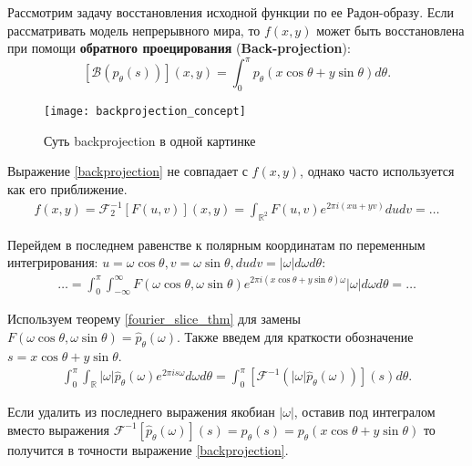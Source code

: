 
Рассмотрим задачу восстановления исходной функции по ее Радон-образу. Если рассматривать модель непрерывного мира, то $f(x, y)$ может быть восстановлена при помощи \textbf{обратного проецирования} (\textbf{Back-projection}):
\begin{equation}
\label{backprojection}
    \left[ \mathcal{B}(p_\theta(s)) \right](x, y) = \int_0^{\pi} p_\theta\left( x\cos\theta + y\sin\theta \right) d\theta.
\end{equation}

\begin{figure}[!h]
    \centering
    \texttt{[image: backprojection\_concept]}
    \caption{Суть backprojection в одной картинке}
\end{figure}

Выражение \eqref{backprojection} не совпадает с $f(x, y)$, однако часто используется как его приближение.
\begin{gather*}
    f(x, y) =
    \mathcal{F}_2^{-1} \left[ F(u, v) \right](x, y) =
    \int_{\mathbb{R}^2} F(u, v) e^{2\pi i (xu + yv)} du dv = \dots
\end{gather*}

Перейдем в последнем равенстве к полярным координатам по переменным интегрирования: $u = \omega\cos\theta, v = \omega\sin\theta, du dv = |\omega| d\omega d\theta$:
\begin{gather*}
    \dots =
    \int_{0}^{\pi} \int_{-\infty}^{\infty} F(\omega\cos\theta, \omega\sin\theta) e^{2\pi i \left( x \cos\theta + y\sin\theta \right)\omega} |\omega| d\omega d \theta = \dots
\end{gather*}

Используем теорему \ref{fourier_slice_thm} для замены $F(\omega\cos\theta, \omega\sin\theta) = \hat{p}_{\theta}(\omega)$. Также введем для краткости обозначение $s = x\cos\theta + y\sin\theta$.
\begin{gather}
\label{fbp_proof}
    \int_{0}^{\pi} \int_{\mathbb{R}} |\omega| \hat{p}_{\theta}(\omega) e^{2\pi i s \omega} d\omega d\theta =
    \int_{0}^{\pi} \left[ \mathcal{F}^{-1} \left( |\omega| \hat{p}_\theta(\omega) \right) \right](s) d\theta.
\end{gather}

Если удалить из последнего выражения якобиан $|\omega|$, оставив под интегралом вместо выражения $\mathcal{F}^{-1}\left[ \hat{p}_\theta(\omega) \right](s) = p_\theta(s) = p_\theta\left( x\cos\theta + y\sin\theta \right)$ то получится в точности выражение \eqref{backprojection}.
